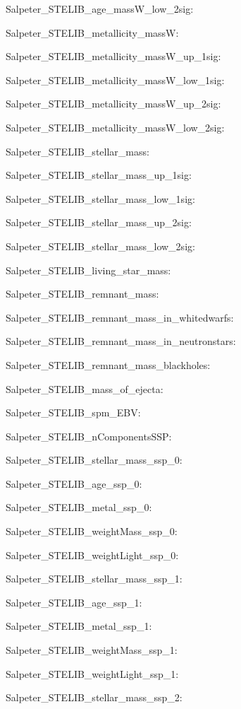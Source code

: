 \item Salpeter\_STELIB\_age\_massW\_low\_2sig: 
\item Salpeter\_STELIB\_metallicity\_massW: 
\item Salpeter\_STELIB\_metallicity\_massW\_up\_1sig: 
\item Salpeter\_STELIB\_metallicity\_massW\_low\_1sig: 
\item Salpeter\_STELIB\_metallicity\_massW\_up\_2sig: 
\item Salpeter\_STELIB\_metallicity\_massW\_low\_2sig: 
\item Salpeter\_STELIB\_stellar\_mass: 
\item Salpeter\_STELIB\_stellar\_mass\_up\_1sig: 
\item Salpeter\_STELIB\_stellar\_mass\_low\_1sig: 
\item Salpeter\_STELIB\_stellar\_mass\_up\_2sig: 
\item Salpeter\_STELIB\_stellar\_mass\_low\_2sig: 
\item Salpeter\_STELIB\_living\_star\_mass: 
\item Salpeter\_STELIB\_remnant\_mass: 
\item Salpeter\_STELIB\_remnant\_mass\_in\_whitedwarfs: 
\item Salpeter\_STELIB\_remnant\_mass\_in\_neutronstars: 
\item Salpeter\_STELIB\_remnant\_mass\_blackholes: 
\item Salpeter\_STELIB\_mass\_of\_ejecta: 
\item Salpeter\_STELIB\_spm\_EBV: 
\item Salpeter\_STELIB\_nComponentsSSP: 
\item Salpeter\_STELIB\_stellar\_mass\_ssp\_0: 
\item Salpeter\_STELIB\_age\_ssp\_0: 
\item Salpeter\_STELIB\_metal\_ssp\_0: 
\item Salpeter\_STELIB\_weightMass\_ssp\_0: 
\item Salpeter\_STELIB\_weightLight\_ssp\_0: 
\item Salpeter\_STELIB\_stellar\_mass\_ssp\_1: 
\item Salpeter\_STELIB\_age\_ssp\_1: 
\item Salpeter\_STELIB\_metal\_ssp\_1: 
\item Salpeter\_STELIB\_weightMass\_ssp\_1: 
\item Salpeter\_STELIB\_weightLight\_ssp\_1: 
\item Salpeter\_STELIB\_stellar\_mass\_ssp\_2: 
